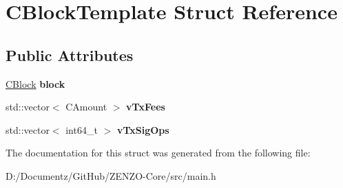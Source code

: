 \hypertarget{struct_c_block_template}{}\section{C\+Block\+Template Struct Reference}
\label{struct_c_block_template}
\subsection*{Public Attributes}
\begin{DoxyCompactItemize}
\item 
\mbox{\label{struct_c_block_template_a13261cbac4dc94f996d1b3ff78e41139}} 
\mbox{\hyperlink{class_c_block}{C\+Block}} {\bfseries block}
\item 
\mbox{\label{struct_c_block_template_a66287bde795cc8e8c8cb59c4e2302d49}} 
std\+::vector$<$ C\+Amount $>$ {\bfseries v\+Tx\+Fees}
\item 
\mbox{\label{struct_c_block_template_a13326eb92a7d2fc073d9f5660dfcdde5}} 
std\+::vector$<$ int64\+\_\+t $>$ {\bfseries v\+Tx\+Sig\+Ops}
\end{DoxyCompactItemize}


The documentation for this struct was generated from the following file\+:\begin{DoxyCompactItemize}
\item 
D\+:/\+Documentz/\+Git\+Hub/\+Z\+E\+N\+Z\+O-\/\+Core/src/main.\+h\end{DoxyCompactItemize}
